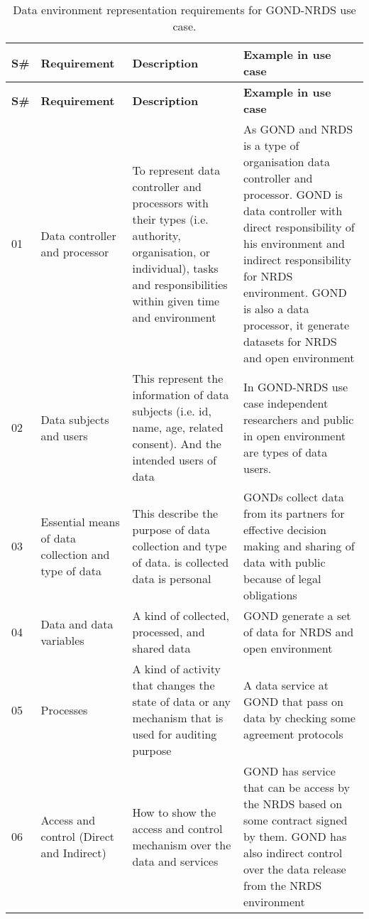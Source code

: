 \begin{longtable}{|p{0.5cm}|p{2.5cm}|p{4cm}|p{6cm}|}
\caption{Data environment representation requirements for GOND-NRDS use case.\label{tab1}}\\

\hline
\textbf{S\#} &  \textbf{Requirement}  &  \textbf{Description}  &  \textbf{Example in use case} \\
\hline
\endfirsthead

\hline
\textbf{S\#} &  \textbf{Requirement}  &  \textbf{Description}  &  \textbf{Example in use case} \\
\hline
\endhead
01 &  Data controller and processor  &  To represent data controller and processors with their types (i.e. authority, organisation, or individual), tasks and responsibilities within given time and environment &  As GOND  and NRDS is a type of organisation data controller and processor. GOND is data controller with direct responsibility of his environment and indirect responsibility for NRDS environment. GOND is also a data processor, it generate datasets for NRDS and open environment\\
\hline
02 &  Data subjects and users  &  This represent the information of data subjects (i.e. id, name, age, related consent). And the intended users of data  & In GOND-NRDS use case independent researchers and public in open environment are types of data users.   \\
\hline
03 &  Essential means of data collection and type of data  &  This describe the purpose of data collection and type of data. is collected data is personal  &  GONDs collect data from its partners for effective decision making and sharing of data with public because of legal obligations   \\
\hline
04 &  Data and data variables &  A kind of collected, processed, and shared data  &  GOND generate a set of data for NRDS and open environment \\
\hline
05 &  Processes  &  A kind of activity that changes the state of data  or any mechanism that is used for auditing purpose &  A data service at GOND that pass on data by checking some agreement protocols \\
\hline
06 &  Access and control (Direct and Indirect)  &  How to show the access and control mechanism over the data and services &  GOND has service that can be access by the NRDS  based on some contract signed by them. GOND has also indirect control over the data release from the NRDS environment  \\

\end{longtable}
